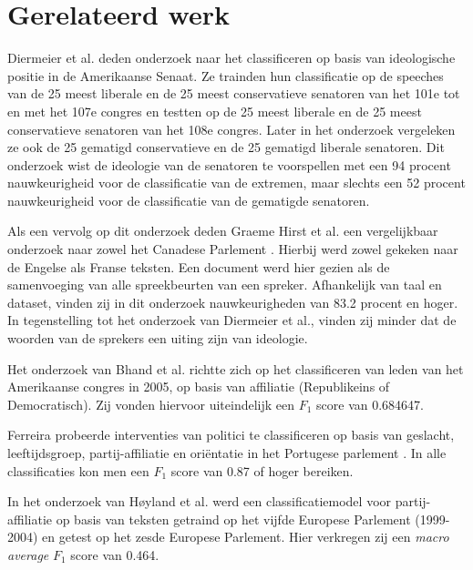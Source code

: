 \section{Gerelateerd werk}
\label{sec:rel}

Diermeier et al. deden onderzoek naar het classificeren op basis van ideologische positie in de Amerikaanse Senaat\cite{diermeier_godbout_yu_kaufmann_2012}. Ze trainden hun classificatie op de speeches van de 25 meest liberale en de 25 meest conservatieve senatoren van het 101e tot en met het 107e congres en testten op de 25 meest liberale en de 25 meest conservatieve senatoren van het 108e congres. Later in het onderzoek vergeleken ze ook de 25 gematigd conservatieve  en de 25 gematigd liberale senatoren.  Dit onderzoek wist de ideologie van de senatoren te voorspellen met een 94 procent nauwkeurigheid voor de classificatie van de extremen, maar slechts een 52 procent nauwkeurigheid voor de classificatie van de gematigde senatoren.\par

Als een vervolg op dit onderzoek deden Graeme Hirst et al. een vergelijkbaar onderzoek naar zowel het Canadese Parlement \cite{Hirst_textto}. Hierbij werd zowel gekeken naar de Engelse als Franse teksten. Een document werd hier gezien als de samenvoeging van alle spreekbeurten van een spreker. Afhankelijk van taal en dataset, vinden zij in dit onderzoek nauwkeurigheden van 83.2 procent en hoger. In tegenstelling tot het onderzoek van Diermeier et al., vinden zij minder dat de woorden van de sprekers een uiting zijn van ideologie. \par

Het onderzoek van Bhand et al. richtte zich op het classificeren van leden van het Amerikaanse congres in 2005, op basis van affiliatie (Republikeins of Democratisch)\cite{bhand}. Zij vonden hiervoor uiteindelijk een $F_1$ score van 0.684647.\par

Ferreira probeerde interventies van politici te classificeren op basis van geslacht, leeftijdsgroep, partij-affiliatie en ori\"{e}ntatie in het Portugese parlement \cite{Ferreira2016UsingTT}. In alle classificaties kon men een $F_1$ score van 0.87 of hoger bereiken.\par
In het onderzoek van Høyland et al. werd een classificatiemodel voor partij-affiliatie op basis van teksten getraind op het vijfde Europese Parlement (1999-2004) en getest op het zesde Europese Parlement\cite{W14-2516}. Hier verkregen zij een \textit{macro average} $F_1$ score van 0.464.\par

